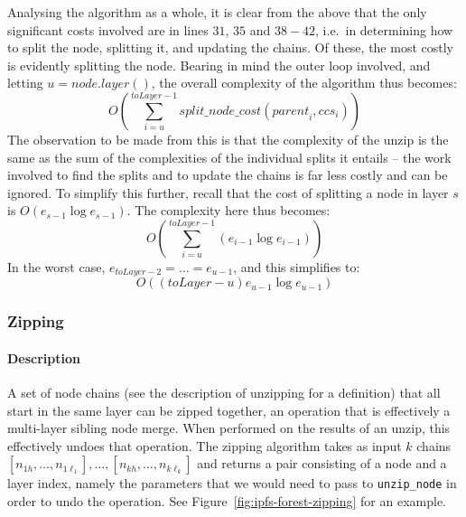 Analysing the algorithm as a whole, it is clear from the above that the only significant costs involved are in lines $31$, $35$ and $38-42$, i.e.~in determining how to split the node, splitting it, and updating the chains. Of these, the most costly is evidently splitting the node. Bearing in mind the outer loop involved, and letting $u = \mathit{node.layer()}$, the overall complexity of the algorithm thus becomes:
%
\[
O\left( \sum_{i=u}^{\mathit{toLayer} - 1} \mathit{split\_node\_cost}(\mathit{parent}_i, \mathit{ccs}_i) \right)
\]
%
The observation to be made from this is that the complexity of the unzip is the same as the sum of the complexities of the individual splits it entails -- the work involved to find the splits and to update the chains is far less costly and can be ignored. To simplify this further, recall that the cost of splitting a node in layer $s$ is $O(e_{s-1} \log e_{s-1})$. The complexity here thus becomes:
%
\[
O\left( \sum_{i=u}^{\mathit{toLayer} - 1} (e_{i-1} \log e_{i-1}) \right)
\]
%
In the worst case, $e_{\mathit{toLayer}-2} = \ldots = e_{u-1}$, and this simplifies to:
%
\[
O((toLayer-u) e_{u-1} \log e_{u-1})
\]

\afterpage{\clearpage}
\newpage

\subsubsection{Zipping}

\paragraph{Description}

A set of node chains (see the description of unzipping for a definition) that all start in the same layer can be zipped together, an operation that is effectively a multi-layer sibling node merge. When performed on the results of an unzip, this effectively undoes that operation. The zipping algorithm takes as input $k$ chains $[n_{1h},\ldots,n_{1\ell_1}], \ldots, [n_{kh},\ldots,n_{k\ell_k}]$ and returns a pair consisting of a node and a layer index, namely the parameters that we would need to pass to \texttt{unzip_node} in order to undo the operation. See Figure~\ref{fig:ipfs-forest-zipping} for an example.


